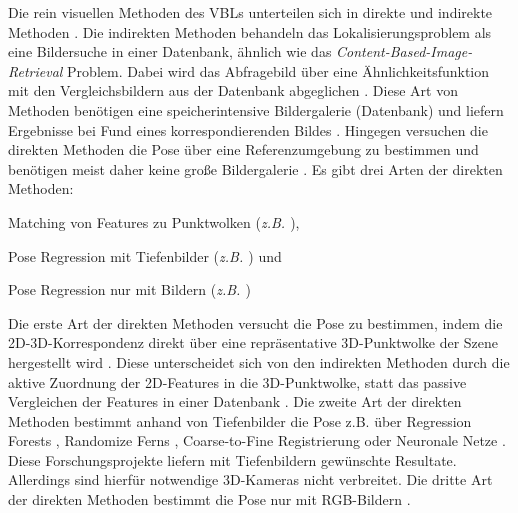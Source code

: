 Die rein visuellen Methoden des VBLs unterteilen sich in direkte und indirekte Methoden \cite{lowryVisualPlaceRecognition2016}. Die indirekten Methoden behandeln das Lokalisierungsproblem als eine Bildersuche in einer Datenbank, ähnlich wie das \textit{Content-Based-Image-Retrieval} \cite{lewContentbasedMultimediaInformation2006} Problem. Dabei wird das Abfragebild über eine Ähnlichkeitsfunktion mit den Vergleichsbildern aus der Datenbank abgeglichen \cite{zhangImageBasedLocalization2006}. Diese Art von Methoden benötigen eine speicherintensive Bildergalerie (Datenbank) und liefern Ergebnisse bei Fund eines korrespondierenden Bildes \cite{lowryVisualPlaceRecognition2016}. Hingegen versuchen die direkten Methoden die Pose über eine Referenzumgebung zu bestimmen und benötigen meist daher keine große Bildergalerie \cite{piascoSurveyVisualBasedLocalization2018}. Es gibt drei Arten der direkten Methoden: 
\begin{enumerate*}[label=\arabic*)]
	\item Matching von Features zu Punktwolken (\textit{z.B. \cite{liWorldwidePoseEstimation2012}}),
	\item Pose Regression mit Tiefenbilder (\textit{z.B. \cite{shottonSceneCoordinateRegression2013}}) und
	\item Pose Regression nur mit Bildern (\textit{z.B. \cite{kendallPoseNetConvolutionalNetwork2015}})
\end{enumerate*}

Die erste Art der direkten Methoden versucht die Pose zu bestimmen, indem die 2D-3D-Korrespondenz direkt über eine repräsentative 3D-Punktwolke der Szene hergestellt wird \cite{piascoSurveyVisualBasedLocalization2018}. Diese unterscheidet sich von den indirekten Methoden durch die aktive Zuordnung der 2D-Features in die 3D-Punktwolke, statt das passive Vergleichen der Features in einer Datenbank \cite{irscharaStructurefrommotionPointClouds2009}. Die zweite Art der direkten Methoden bestimmt anhand von Tiefenbilder die Pose z.B. über Regression Forests \cite{shottonSceneCoordinateRegression2013}, Randomize Ferns \cite{glockerRealTimeRGBDCamera2015}, Coarse-to-Fine Registrierung \cite{santosMappingIndoorSpaces2016} oder Neuronale Netze \cite{massicetiRandomForestsNeural2017}. Diese Forschungsprojekte liefern mit Tiefenbildern gewünschte Resultate. Allerdings sind hierfür notwendige 3D-Kameras nicht verbreitet. Die dritte Art der direkten Methoden bestimmt die Pose nur mit RGB-Bildern \cite{kendallPoseNetConvolutionalNetwork2015}.

